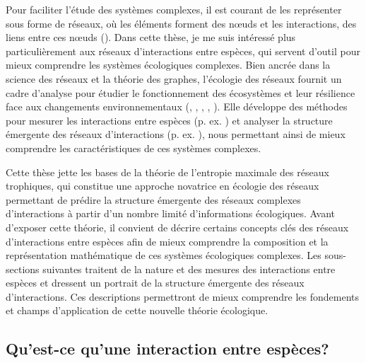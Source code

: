 Pour faciliter l'étude des systèmes complexes, il est courant de les représenter
sous forme de réseaux, où les éléments forment des nœuds et les interactions,
des liens entre ces nœuds (\cite{Newman2003Structure}). Dans cette thèse, je me
suis intéressé plus particulièrement aux réseaux d'interactions entre espèces,
qui servent d'outil pour mieux comprendre les systèmes écologiques complexes.
Bien ancrée dans la science des réseaux et la théorie des graphes, l'écologie
des réseaux fournit un cadre d'analyse pour étudier le fonctionnement des
écosystèmes et leur résilience face aux changements environnementaux
(\cite{Proulx2005Network}, \cite{McCann2007Protecting}, \cite{McCann2011Food},
\cite{Rooney2012Integrating}, \cite{Valiente-Banuet2019Species}). Elle développe
des méthodes pour mesurer les interactions entre espèces (p. ex.
\cite{Jordano2016Sampling}) et analyser la structure émergente des réseaux
d'interactions (p. ex. \cite{Delmas2019Analysing}), nous permettant ainsi de
mieux comprendre les caractéristiques de ces systèmes complexes. 

Cette thèse jette les bases de la théorie de l'entropie maximale des réseaux
trophiques, qui constitue une approche novatrice en écologie des réseaux
permettant de prédire la structure émergente des réseaux complexes
d'interactions à partir d'un nombre limité d'informations écologiques. Avant
d'exposer cette théorie, il convient de décrire certains concepts clés des
réseaux d'interactions entre espèces afin de mieux comprendre la composition et
la représentation mathématique de ces systèmes écologiques complexes. Les sous-sections
suivantes traitent de la nature et des mesures des interactions entre espèces et
dressent un portrait de la structure émergente des réseaux d'interactions. Ces
descriptions permettront de mieux comprendre les fondements et champs d'application
de cette nouvelle théorie écologique.

\subsection{Qu'est-ce qu'une interaction entre espèces?} 

